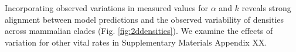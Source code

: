 \documentclass[]{rsos}%
\begin{document}
Incorporating observed variations in measured values for $\alpha$ and $k$ reveals strong alignment between model predictions and the observed variability of densities across mammalian clades (Fig. \ref{fig:2ddensities}).
We examine the effects of variation for other vital rates in Supplementary Materials Appendix XX. 





\end{document}
